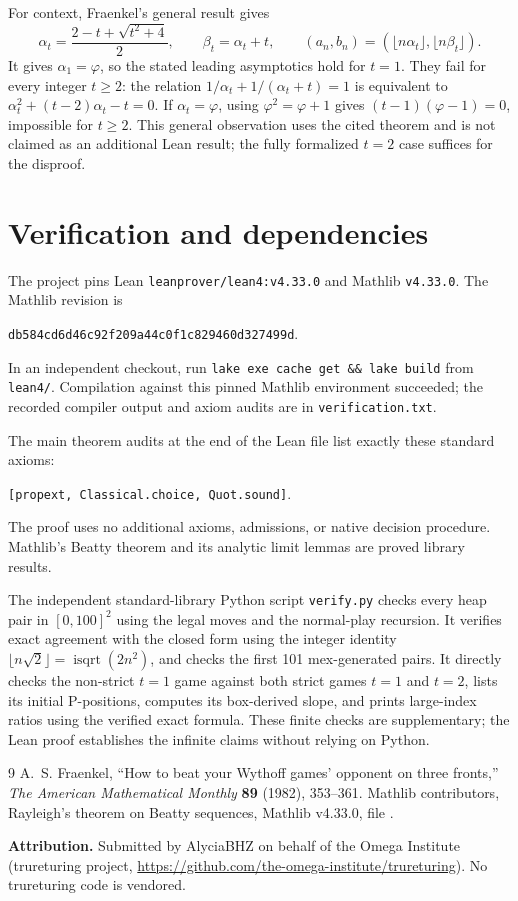 \documentclass[11pt]{article}
\begin{document}
For context, Fraenkel's general result gives
\[
\alpha_t=\frac{2-t+\sqrt{t^2+4}}2,\qquad
\beta_t=\alpha_t+t,\qquad
(a_n,b_n)=(\lfloor n\alpha_t\rfloor,\lfloor n\beta_t\rfloor).
\]
It gives $\alpha_1=\varphi$, so the stated leading asymptotics hold for $t=1$. They fail for every integer $t\ge2$: the relation
$1/\alpha_t+1/(\alpha_t+t)=1$ is equivalent to
$\alpha_t^2+(t-2)\alpha_t-t=0$. If $\alpha_t=\varphi$, using $\varphi^2=\varphi+1$ gives $(t-1)(\varphi-1)=0$, impossible for $t\ge2$. This general observation uses the cited theorem and is not claimed as an additional Lean result; the fully formalized $t=2$ case suffices for the disproof.

\section{Verification and dependencies}
The project pins Lean \texttt{leanprover/lean4:v4.33.0} and Mathlib \texttt{v4.33.0}. The Mathlib revision is
\begin{center}\texttt{db584cd6d46c92f209a44c0f1c829460d327499d}.\end{center} In an independent checkout, run \texttt{lake exe cache get \&\& lake build} from \texttt{lean4/}. Compilation against this pinned Mathlib environment succeeded; the recorded compiler output and axiom audits are in \texttt{verification.txt}.

The main theorem audits at the end of the Lean file list exactly these standard axioms:
\begin{center}\texttt{[propext, Classical.choice, Quot.sound]}.\end{center} The proof uses no additional axioms, admissions, or native decision procedure. Mathlib's Beatty theorem and its analytic limit lemmas are proved library results.

The independent standard-library Python script \texttt{verify.py} checks every heap pair in $[0,100]^2$ using the legal moves and the normal-play recursion. It verifies exact agreement with the closed form using the integer identity $\lfloor n\sqrt2\rfloor=\operatorname{isqrt}(2n^2)$, and checks the first 101 mex-generated pairs. It directly checks the non-strict $t=1$ game against both strict games
$t=1$ and $t=2$, lists its initial P-positions, computes its box-derived
slope, and prints large-index ratios using the verified exact formula. These finite checks are supplementary; the Lean proof establishes the infinite claims without relying on Python.

\begin{thebibliography}{9}
 A.~S. Fraenkel, ``How to beat your Wythoff games' opponent on three fronts,'' \emph{The American Mathematical Monthly} \textbf{89} (1982), 353--361.
 Mathlib contributors, Rayleigh's theorem on Beatty sequences, Mathlib v4.33.0, file .
\end{thebibliography}

\textbf{Attribution.} Submitted by AlyciaBHZ on behalf of the Omega Institute (trureturing project, \url{https://github.com/the-omega-institute/trureturing}). No trureturing code is vendored.
\end{document}
